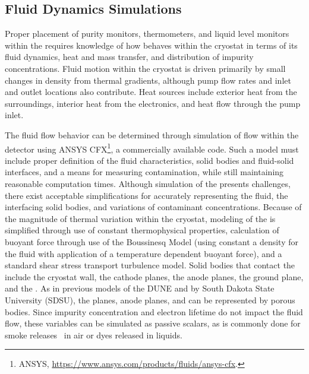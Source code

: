 \subsection{Fluid Dynamics Simulations}
\label{sec:fdgen-slow-cryo-cfd}

Proper placement of purity monitors, thermometers, and liquid level monitors within the  requires knowledge of how  behaves within the cryostat in terms of its fluid dynamics, heat and mass transfer, and distribution of impurity concentrations. 
Fluid motion within the cryostat is driven primarily by small changes in density from thermal gradients, although pump flow rates and inlet and outlet locations also contribute. 
Heat sources include exterior heat from the surroundings, interior heat from the electronics, and heat flow through the pump inlet.

The fluid flow behavior can be determined through simulation of  flow within the detector using ANSYS CFX\footnote{ANSYS\texttrademark{}, \url{https://www.ansys.com/products/fluids/ansys-cfx}.}, a commercially available  code. Such a model must include proper definition of the fluid characteristics, solid bodies and fluid-solid interfaces, and a means for measuring contamination, while still maintaining reasonable computation times. 
Although simulation of the  presents challenges, there exist acceptable simplifications for accurately representing the fluid, the interfacing solid bodies, and variations of contaminant concentrations. Because of the magnitude of thermal variation within the cryostat, modeling of the  is simplified through use of constant thermophysical properties, calculation of buoyant force through use of the Boussinesq Model (using constant a density for the fluid with application of a temperature dependent buoyant force), and a standard shear stress transport turbulence model. Solid bodies that contact the  include the cryostat wall, the cathode planes, the anode planes, the ground plane, and the . As in previous  models of the DUNE  and  by South Dakota State University (SDSU)\cite{docdb-5915}, the  planes, anode planes, and  can be represented by porous bodies. Since impurity concentration and electron lifetime do not impact the fluid flow, these variables can be simulated as  passive scalars, as is commonly done for smoke releases~\cite{cfd-1} in air or dyes released in liquids.

